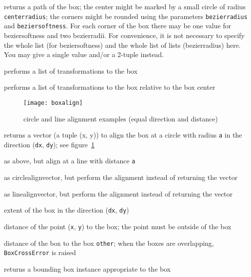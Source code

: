 \begin{description}
\raggedright
\item[\texttt{path(centerradius=None, bezierradius=None,
beziersoftness=1)}:] returns a path of the box; the center might be
marked by a small circle of radius \verb|centerradius|; the corners
might be rounded using the parameters \verb|bezierradius| and
\verb|beziersoftness|. For each corner of the box there may be one value
for beziersoftness and two bezierradii. For convenience, it is not necessary
to specify the whole list (for beziersoftness) and the whole list of
lists (bezierradius) here. You may give a single value and/or a 2-tuple instead.
\item[\texttt{transform(*trafos)}:] performs a list of transformations
to the box
\item[\texttt{reltransform(*trafos)}:] performs a list of
transformations to the box relative to the box center

\begin{figure}
\centerline{\texttt{[image: boxalign]}}
\caption{circle and line alignment examples (equal direction and
distance)}
\label{fig:boxalign}
\end{figure}

\item[\texttt{circlealignvector(a, dx, dy)}:] returns a vector (a
tuple (x, y)) to align the box at a circle with radius \verb|a| in
the direction (\verb|dx|, \verb|dy|); see figure~\ref{fig:boxalign}
\item[\texttt{linealignvector(a, dx, dy)}:] as above, but align at a
line with distance \verb|a|
\item[\texttt{circlealign(a, dx, dy)}:] as circlealignvector, but
perform the alignment instead of returning the vector
\item[\texttt{linealign(a, dx, dy)}:] as linealignvector, but
perform the alignment instead of returning the vector
\item[\texttt{extent(dx, dy)}:] extent of the box in the direction
(\verb|dx|, \verb|dy|)
\item[\texttt{pointdistance(x, y)}:] distance of the point (\verb|x|,
\verb|y|) to the box; the point must be outside of the box
\item[\texttt{boxdistance(other)}:] distance of the box to the box
\verb|other|; when the boxes are overlapping, \verb|BoxCrossError| is
raised
\item[\texttt{bbox()}:] returns a bounding box instance appropriate to
the box
\end{description}

